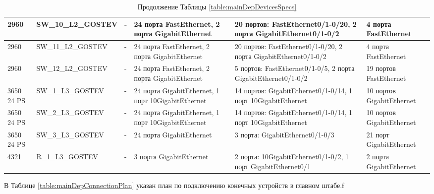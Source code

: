 \documentclass[14pt, a4paper]{extarticle}
\numberwithin{equation}{section}
\begin{document}
\begin{landscape}
\begin{table}[H]
\centering
\small
\caption{Продолжение Таблицы \ref{table:mainDepDevicesSpecs}}
\begin{tabular}{|m{2.5cm}|m{4cm}|m{2.5cm}|m{4.2cm}|m{5.3cm}|m{4cm}|}
\hline
2960 &
SW\_10\_L2\_GOSTEV &
- &
24 порта FastEthernet, 2 порта GigabitEthernet &
20 портов: FastEthernet0/1-0/20, 2 порта GigabitEthernet0/1-0/2 &
4 порта FastEthernet \\
\hline
2960 &
SW\_11\_L2\_GOSTEV &
- &
24 порта FastEthernet, 2 порта GigabitEthernet &
20 портов: FastEthernet0/1-0/20, 2 порта GigabitEthernet0/1-0/2 &
4 порта FastEthernet \\
\hline
2960 &
SW\_12\_L2\_GOSTEV &
- &
24 порта FastEthernet, 2 порта GigabitEthernet &
5 портов: FastEthernet0/1-0/5, 2 порта GigabitEthernet0/1-0/2 &
19 портов FastEthernet \\
\hline
3650 24 PS &
SW\_1\_L3\_GOSTEV &
- &
24 порта GigabitEthernet, 1 порт 10GigabitEthernet &
14 портов: GigabitEthernet0/1-0/14, 1 порт 10GigabitEthernet &
10 портов GigabitEthernet \\
\hline
3650 24 PS &
SW\_2\_L3\_GOSTEV &
- &
24 порта GigabitEthernet, 1 порт 10GigabitEthernet &
14 портов: GigabitEthernet0/1-0/14, 1 порт 10GigabitEthernet &
10 портов GigabitEthernet \\
\hline
3650 24 PS &
SW\_3\_L3\_GOSTEV &
- &
24 порта GigabitEthernet&
3 порта: GigabitEthernet0/1-0/3 &
21 порт GigabitEthernet \\
\hline
4321 &
R\_1\_L3\_GOSTEV &
- &
3 порта GigabitEthernet &
2 порта: 10GigabitEthernet0/1-0/2, 1 порт GigabitEthernet0/1 &
2 порта GigabitEthernet\\
\hline
\end{tabular}
\end{table}
\end{landscape}

В Таблице \ref{table:mainDepConnectionPlan} указан план по подключению конечных устройств в главном штабе.f
\end{document}
